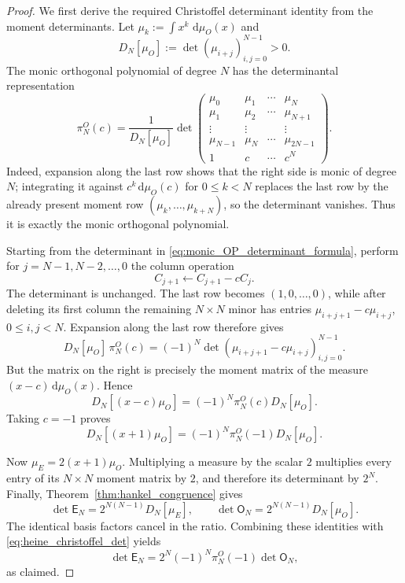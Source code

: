 \documentclass[11pt]{amsart}
\numberwithin{equation}{section}
\theoremstyle{plain}
\theoremstyle{definition}
\theoremstyle{remark}
\newcommand{\E}{\mathsf E}
\newcommand{\Omat}{\mathsf O}
\newcommand{\dd}{\,\mathrm d}
\begin{document}
\begin{proof}
We first derive the required Christoffel determinant identity from the moment determinants.  Let $\mu_k:=\int x^k\,\dd\mu_O(x)$ and
\begin{equation}
D_N[\mu_O]:=\det(\mu_{i+j})_{i,j=0}^{N-1}>0.
\end{equation}
The monic orthogonal polynomial of degree $N$ has the determinantal representation
\begin{equation}
\pi_N^O(c)
=\frac{1}{D_N[\mu_O]}
\det\begin{pmatrix}
\mu_0&\mu_1&\cdots&\mu_N\\
\mu_1&\mu_2&\cdots&\mu_{N+1}\\
\vdots&\vdots&&\vdots\\
\mu_{N-1}&\mu_N&\cdots&\mu_{2N-1}\\
1&c&\cdots&c^N
\end{pmatrix}.
\label{eq:monic_OP_determinant_formula}
\end{equation}
Indeed, expansion along the last row shows that the right side is monic of degree $N$; integrating it against $c^k\dd\mu_O(c)$ for $0\le k<N$ replaces the last row by the already present moment row $(\mu_k,\ldots,\mu_{k+N})$, so the determinant vanishes.  Thus it is exactly the monic orthogonal polynomial.

Starting from the determinant in \eqref{eq:monic_OP_determinant_formula}, perform for $j=N-1,N-2,\ldots,0$ the column operation
\begin{equation}
C_{j+1}\leftarrow C_{j+1}-cC_j.
\end{equation}
The determinant is unchanged.  The last row becomes $(1,0,\ldots,0)$, while after deleting its first column the remaining $N\times N$ minor has entries
$\mu_{i+j+1}-c\mu_{i+j}$, $0\le i,j<N$.  Expansion along the last row therefore gives
\begin{equation}
D_N[\mu_O]\,\pi_N^O(c)
=(-1)^N\det(\mu_{i+j+1}-c\mu_{i+j})_{i,j=0}^{N-1}.
\end{equation}
But the matrix on the right is precisely the moment matrix of the measure $(x-c)\dd\mu_O(x)$.  Hence
\begin{equation}
D_N[(x-c)\mu_O]
=(-1)^N\pi_N^O(c)D_N[\mu_O].
\label{eq:heine_christoffel_general}
\end{equation}
Taking $c=-1$ proves
\begin{equation}
D_N[(x+1)\mu_O]
=(-1)^N\pi_N^O(-1)D_N[\mu_O].
\label{eq:heine_christoffel_det}
\end{equation}

Now $\mu_E=2(x+1)\mu_O$.  Multiplying a measure by the scalar $2$ multiplies every entry of its $N\times N$ moment matrix by $2$, and therefore its determinant by $2^N$.  Finally, Theorem~\ref{thm:hankel_congruence} gives
\begin{equation}
\det\E_N=2^{N(N-1)}D_N[\mu_E],
\qquad
\det\Omat_N=2^{N(N-1)}D_N[\mu_O].
\end{equation}
The identical basis factors cancel in the ratio.  Combining these identities with \eqref{eq:heine_christoffel_det} yields
\begin{equation}
\det\E_N
=2^N(-1)^N\pi_N^O(-1)\det\Omat_N,
\end{equation}
as claimed.
\end{proof}
\end{document}
